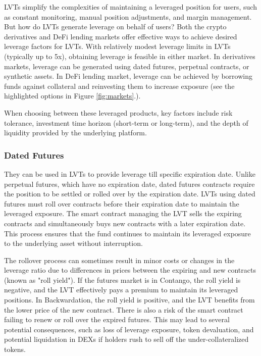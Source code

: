 LVTs simplify the complexities of maintaining a leveraged position for users, such as constant monitoring, manual position adjustments, and margin management. But how do LVTs generate leverage on behalf of users? Both the crypto derivatives and DeFi lending markets offer effective ways to achieve desired leverage factors for LVTs. With relatively modest leverage limits in LVTs (typically up to 5x), obtaining leverage is feasible in either market. In derivatives markets, leverage can be generated using dated futures, perpetual contracts, or synthetic assets. In DeFi lending market, leverage can be achieved by borrowing funds against collateral and reinvesting them to increase exposure (see the highlighted options in Figure \ref{fig:markets}.). 

When choosing between these leveraged products, key factors include risk tolerance, investment time horizon (short-term or long-term), and the depth of liquidity provided by the underlying platform.

\subsubsection{Dated Futures}
They can be used in LVTs to provide leverage till specific expiration date. Unlike perpetual futures, which have no expiration date, dated futures contracts require the position to be settled or rolled over by the expiration date. LVTs using dated futures must roll over contracts before their expiration date to maintain the leveraged exposure. The smart contract managing the LVT sells the expiring contracts and simultaneously buys new contracts with a later expiration date. This process ensures that the fund continues to maintain its leveraged exposure to the underlying asset without interruption. 

The rollover process can sometimes result in minor costs or changes in the leverage ratio due to differences in prices between the expiring and new contracts (known as "roll yield"). If the futures market is in Contango, the roll yield is negative, and the LVT effectively pays a premium to maintain its leveraged positions. In Backwardation, the roll yield is positive, and the LVT benefits from the lower price of the new contract. There is also a risk of the smart contract failing to renew or roll over the expired futures. This may lead to several potential consequences, such as loss of leverage exposure, token devaluation, and potential liquidation in DEXs if holders rush to sell off the under-collateralized tokens.

